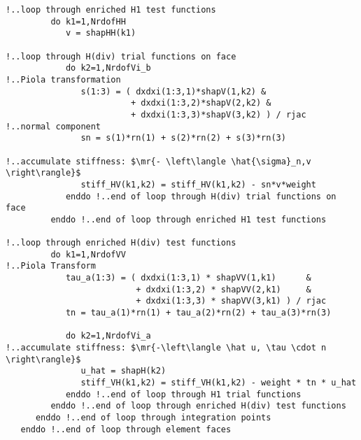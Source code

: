 \begin{lstlisting}[mathescape,caption=\file{POISSON/ULTRAWEAK\_DPG/}\routine{elem}: boundary integration]
!..loop through enriched H1 test functions
         do k1=1,NrdofHH
            v = shapHH(k1)

!..loop through H(div) trial functions on face
            do k2=1,NrdofVi_b
!..Piola transformation
               s(1:3) = ( dxdxi(1:3,1)*shapV(1,k2) &
                         + dxdxi(1:3,2)*shapV(2,k2) &
                         + dxdxi(1:3,3)*shapV(3,k2) ) / rjac
!..normal component
               sn = s(1)*rn(1) + s(2)*rn(2) + s(3)*rn(3)

!..accumulate stiffness: $\mr{- \left\langle \hat{\sigma}_n,v \right\rangle}$
               stiff_HV(k1,k2) = stiff_HV(k1,k2) - sn*v*weight
            enddo !..end of loop through H(div) trial functions on face
         enddo !..end of loop through enriched H1 test functions

!..loop through enriched H(div) test functions
         do k1=1,NrdofVV
!..Piola Transform
            tau_a(1:3) = ( dxdxi(1:3,1) * shapVV(1,k1)      &
                          + dxdxi(1:3,2) * shapVV(2,k1)     &
                          + dxdxi(1:3,3) * shapVV(3,k1) ) / rjac
            tn = tau_a(1)*rn(1) + tau_a(2)*rn(2) + tau_a(3)*rn(3)

            do k2=1,NrdofVi_a
!..accumulate stiffness: $\mr{-\left\langle \hat u, \tau \cdot n \right\rangle}$
               u_hat = shapH(k2)
               stiff_VH(k1,k2) = stiff_VH(k1,k2) - weight * tn * u_hat
            enddo !..end of loop through H1 trial functions
         enddo !..end of loop through enriched H(div) test functions
      enddo !..end of loop through integration points
   enddo !..end of loop through element faces
\end{lstlisting}

